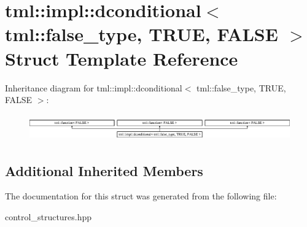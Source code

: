 \hypertarget{structtml_1_1impl_1_1dconditional_3_01tml_1_1false__type_00_01TRUE_00_01FALSE_01_4}{\section{tml\+:\+:impl\+:\+:dconditional$<$ tml\+:\+:false\+\_\+type, T\+R\+U\+E, F\+A\+L\+S\+E $>$ Struct Template Reference}
\label{structtml_1_1impl_1_1dconditional_3_01tml_1_1false__type_00_01TRUE_00_01FALSE_01_4}
}
Inheritance diagram for tml\+:\+:impl\+:\+:dconditional$<$ tml\+:\+:false\+\_\+type, T\+R\+U\+E, F\+A\+L\+S\+E $>$\+:\begin{figure}[H]
\begin{center}
\leavevmode
\includegraphics[height=1.134752cm]{structtml_1_1impl_1_1dconditional_3_01tml_1_1false__type_00_01TRUE_00_01FALSE_01_4}
\end{center}
\end{figure}
\subsection*{Additional Inherited Members}


The documentation for this struct was generated from the following file\+:\begin{DoxyCompactItemize}
\item 
control\+\_\+structures.\+hpp\end{DoxyCompactItemize}
